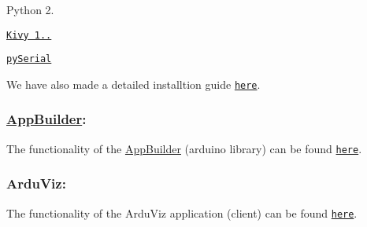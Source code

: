 \begin{DoxyItemize}
\item Python 2.
\item \href{http://kivy.org}{\tt Kivy 1..}
\item \href{http://pyserial.sourceforge.net}{\tt py\+Serial}
\end{DoxyItemize}

We have also made a detailed installtion guide \href{md_documentation_installation.html}{\tt here}.

\subsubsection*{\hyperlink{class_app_builder}{App\+Builder}\+:}

The functionality of the \hyperlink{class_app_builder}{App\+Builder} (arduino library) can be found \href{md_documentation_appb_intro.html}{\tt here}.

\subsubsection*{Ardu\+Viz\+:}

The functionality of the Ardu\+Viz application (client) can be found \href{md_documentation_arduviz_intro.html}{\tt here}. 